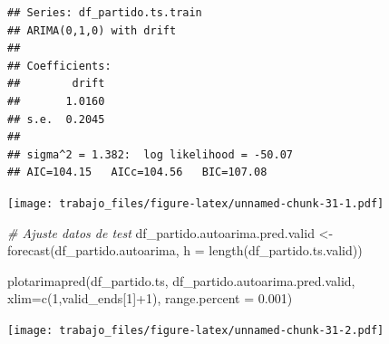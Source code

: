 \documentclass[
]{article}
\newenvironment{Shaded}{\begin{snugshade}}{\end{snugshade}}
\newcommand{\AttributeTok}[1]{\textcolor[rgb]{0.77,0.63,0.00}{#1}}
\newcommand{\CommentTok}[1]{\textcolor[rgb]{0.56,0.35,0.01}{\textit{#1}}}
\newcommand{\DecValTok}[1]{\textcolor[rgb]{0.00,0.00,0.81}{#1}}
\newcommand{\FloatTok}[1]{\textcolor[rgb]{0.00,0.00,0.81}{#1}}
\newcommand{\FunctionTok}[1]{\textcolor[rgb]{0.00,0.00,0.00}{#1}}
\newcommand{\NormalTok}[1]{#1}
\newcommand{\OtherTok}[1]{\textcolor[rgb]{0.56,0.35,0.01}{#1}}
\newcommand{\SpecialCharTok}[1]{\textcolor[rgb]{0.00,0.00,0.00}{#1}}
\newcommand{\StringTok}[1]{\textcolor[rgb]{0.31,0.60,0.02}{#1}}
\begin{document}
\begin{verbatim}
## Series: df_partido.ts.train 
## ARIMA(0,1,0) with drift 
## 
## Coefficients:
##        drift
##       1.0160
## s.e.  0.2045
## 
## sigma^2 = 1.382:  log likelihood = -50.07
## AIC=104.15   AICc=104.56   BIC=107.08
\end{verbatim}

\begin{Shaded}
\end{Shaded}

\texttt{[image: trabajo\_files/figure-latex/unnamed-chunk-31-1.pdf]}

\begin{Shaded}
\begin{Highlighting}[]
\CommentTok{\# Ajuste datos de test}
\NormalTok{df\_partido.autoarima.pred.valid }\OtherTok{\textless{}{-}} \FunctionTok{forecast}\NormalTok{(df\_partido.autoarima, }\AttributeTok{h =} \FunctionTok{length}\NormalTok{(df\_partido.ts.valid))}

\FunctionTok{plotarimapred}\NormalTok{(df\_partido.ts, df\_partido.autoarima.pred.valid, }\AttributeTok{xlim=}\FunctionTok{c}\NormalTok{(}\DecValTok{1}\NormalTok{,valid\_ends[}\DecValTok{1}\NormalTok{]}\SpecialCharTok{+}\DecValTok{1}\NormalTok{), }\AttributeTok{range.percent =} \FloatTok{0.001}\NormalTok{)}
\end{Highlighting}
\end{Shaded}

\texttt{[image: trabajo\_files/figure-latex/unnamed-chunk-31-2.pdf]}

\begin{Shaded}
\end{Shaded}
\end{document}
